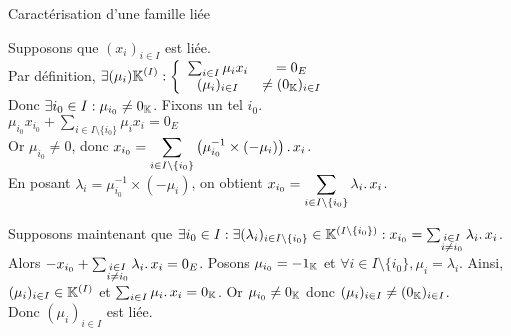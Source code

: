 \documentclass{article}
\renewenvironment{question_kholle}[2][ ]
{
	\subsection{\texorpdfstring{#2}{}}
	\notblank{#1}
	{
		\noindent #1
		\bigbreak
	}
	{}
	\begin{proof}
}
{
	\end{proof}
}
\begin{document}
\begin{question_kholle}
  [Une famille est liée si et seulement si l'un de ses vecteurs est une combinaison linéaires d'autres vecteurs de la famille.
    \begin{equation}
      (x_i)_{i \in I} \text{ est liée}
      \iff \exists i_0 \in I : \exists (\lambda_i)_{i \in I\setminus\{i_0\}} \in \K^{\left( I \setminus \{i_0\} \right)} :
      x_{i_0} = \sum_{\substack{i \in I \\ i \neq i_0}} \lambda_i \ldotp x_i
    \end{equation}]
  {Caractérisation d'une famille liée}

  Supposons que $(x_i)_{i \in I}$ est liée. \\
  Par définition, $\displaystyle \exists (\mu_i) \mathbb K^{(I)} :
    \left\{ \begin{array}{ccc}
      \sum_{i \in I} \mu_i x_i & = 0_E                 \\
      (\mu_i)_{i \in I}        & \neq (0_{\mathbb K})_{i \in I}
    \end{array} \right.$ \\
  Donc $\exists i_0 \in I : \mu_{i_0} \neq 0_{\mathbb K}$. Fixons un tel $i_0$. \\
  $\displaystyle \mu_{i_0} x_{i_0} + \sum_{i \in I \setminus \{i_0\}} \mu_i x_i = 0_E$ \\
  Or $\mu_{i_0} \neq 0$, donc $\displaystyle x_{i_0} = \sum_{i \in I \setminus \{i_0\}} \left( \mu_{i_0}^{-1} \times (-\mu_i) \right) \ldotp x_i$. \\
  En posant $\lambda_i = \mu_{i_0}^{-1} \times (-\mu_i)$, on obtient $x_{i_0} = \displaystyle \sum_{i \in I \setminus \{i_0\}} \lambda_i \ldotp x_i$.

  Supposons maintenant que $\exists i_0 \in I : \exists (\lambda_i)_{i \in I\setminus\{i_0\}} \in \mathbb K^{\left( I \setminus \{i_0\} \right)} :
    x_{i_0} = \sum_{\substack{i \in I \\ i \neq i_0}} \lambda_i \ldotp x_i$. \\
  Alors $-x_{i_0} + \sum_{\substack{i \in I \\ i \neq i_0}} \lambda_i \ldotp x_i = 0_E$.
  Posons $\mu_{i_0} = - 1_{\mathbb K}$ et $\forall i \in I \!\setminus\! \{i_0\}, \mu_i = \lambda_i$.
  Ainsi, $(\mu_i)_{i \in I} \in \mathbb K^{(I)}$ et $\sum_{i \in I} \mu_i \ldotp x_i = 0_{\mathbb K}$. Or $\mu_{i_0} \neq 0_{\mathbb K}$ donc $(\mu_i)_{i \in I} \neq (0_{\mathbb K})_{i \in I}$. \\
  Donc $(\mu_i)_{i \in I}$ est liée.
\end{question_kholle}
\end{document}
